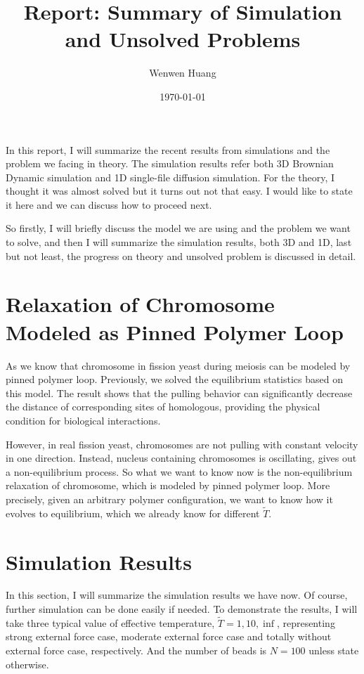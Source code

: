 \documentclass[12pt,a4paper]{article}
\begin{document}
\title{Report: Summary of Simulation and Unsolved Problems}
\author{Wenwen Huang}
\date{\today}

\maketitle

In this report, I will summarize the recent results from simulations and the
problem we facing in theory. The simulation results refer both 3D Brownian
Dynamic simulation and 1D single-file diffusion simulation. For the theory, I
thought it was almost solved but it turns out not that easy. I would like to
state it here and we can discuss how to proceed next.

So firstly, I will briefly discuss the model we are using and the problem we
want to solve, and then I will summarize the simulation results, both 3D and
1D, last but not least, the progress on theory and unsolved problem is discussed
in detail.

\section{Relaxation of Chromosome Modeled as Pinned Polymer Loop}

As we know that chromosome in fission yeast during meiosis can be modeled by
pinned polymer loop. Previously, we solved the equilibrium statistics based on
this model. The result shows that the pulling behavior can significantly
decrease the distance of corresponding sites of homologous, providing the
physical condition for biological interactions. 

However, in real fission yeast, chromosomes are not pulling with constant
velocity in one direction. Instead, nucleus containing chromosomes is
oscillating, gives out a non-equilibrium process. So what we want to know now is
the non-equilibrium relaxation of chromosome, which is modeled by pinned polymer
loop. More precisely, given an arbitrary polymer configuration, we want to know
how it evolves to equilibrium, which we already know for different $\tilde{T}$.

\section{Simulation Results}
In this section, I will summarize the simulation results we have now. Of
course, further simulation can be done easily if needed. To demonstrate the
results, I will take three typical value of effective temperature, $\tilde{T} =
1, 10, \inf$, representing strong external force case, moderate external force
case and totally without external force case, respectively. And the number of
beads is $N = 100$ unless state otherwise. 
\end{document}
